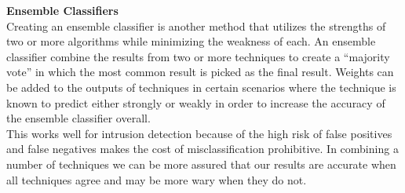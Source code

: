 \documentclass[12pt]{article} %
\begin{document}
\noindent
\textbf{Ensemble Classifiers}\\
Creating an ensemble classifier is another method that utilizes the strengths of two or more algorithms while minimizing the weakness of each. An ensemble classifier combine the results from two or more techniques to create a ``majority vote'' in which the most common result is picked as the final result. Weights can be added to the outputs of techniques in certain scenarios where the technique is known to predict either strongly or weakly in order to increase the accuracy of the ensemble classifier overall.\\
This works well for intrusion detection because of the high risk of false positives and false negatives makes the cost of misclassification prohibitive. In combining a number of techniques we can be more assured that our results are accurate when all techniques agree and may be more wary when they do not.\\
\end{document}
